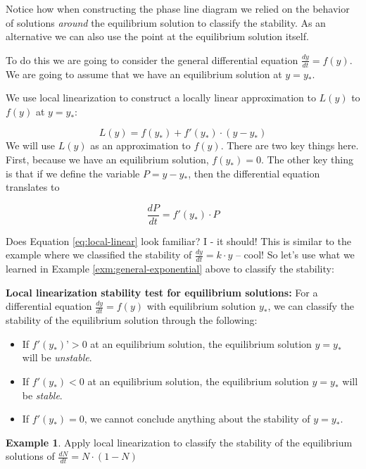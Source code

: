 \documentclass[
]{book}
\providecommand{\tightlist}{%
  \setlength{\itemsep}{0pt}\setlength{\parskip}{0pt}}
\theoremstyle{definition}
\theoremstyle{definition}
\newtheorem{example}{Example}[chapter]
\theoremstyle{definition}
\theoremstyle{remark}
\begin{document}
Notice how when constructing the phase line diagram we relied on the behavior of solutions \emph{around} the equilibrium solution to classify the stability. As an alternative we can also use the point at the equilibrium solution itself.

To do this we are going to consider the general differential equation \(\displaystyle \frac{dy}{dt}=f(y)\). We are going to assume that we have an equilibrium solution at \(y=y_{*}\).

We use local linearization to construct a locally linear approximation to \(L(y)\) to \(f(y)\) at \(y=y_{*}\):

\[L(y) = f(y_{*}) + f'(y_{*}) \cdot (y-y_{*})  \]
We will use \(L(y)\) as an approximation to \(f(y)\). There are two key things here. First, because we have an equilibrium solution, \(f(y_{*}) =0\). The other key thing is that if we define the variable \(P = y-y_{*}\), then the differential equation translates to

\begin{equation}
\frac{dP}{dt} = f'(y_{*}) \cdot P  \label{eq:local-linear}
\end{equation}

Does Equation \eqref{eq:local-linear} look familiar? I - it should! This is similar to the example where we classified the stability of \(\displaystyle \frac{dy}{dt} = k \cdot y\) -- cool! So let's use what we learned in Example \ref{exm:general-exponential} above to classify the stability:

\textbf{Local linearization stability test for equilibrium solutions:} For a differential equation \(\displaystyle \frac{dy}{dt} = f(y)\) with equilibrium solution \(y_{*}\), we can classify the stability of the equilibrium solution through the following:

\begin{itemize}
\tightlist
\item
  If \(f'(y_{*})’>0\) at an equilibrium solution, the equilibrium solution \(y=y_{*}\) will be \emph{unstable}.
\item
  If \(f'(y_{*}) <0\) at an equilibrium solution, the equilibrium solution \(y=y_{*}\) will be \emph{stable}.
\item
  If \(f'(y_{*}) = 0\), we cannot conclude anything about the stability of \(y=y_{*}\).
\end{itemize}

\begin{example}
\protect\hypertarget{exm:unnamed-chunk-85}{}{\label{exm:unnamed-chunk-85} }Apply local linearization to classify the stability of the equilibrium solutions of \(\displaystyle \frac{dN}{dt} = N \cdot(1-N)\)
\end{example}
\end{document}
